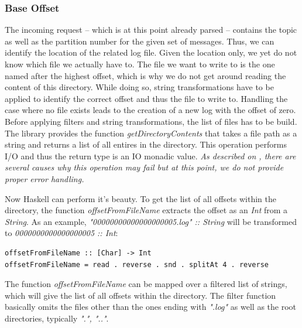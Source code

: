 \subsubsection{Base Offset}

The incoming request -- which is at this point already parsed -- contains the
topic as well as the partition number for the given set of messages. Thus, we
can identify the location of the related log file. Given the location only, we yet do
not know which file we actually have to.
The file we want to write to is the one named after the highest offset,
which is why we do not get around reading the content of this directory. While doing so,
string transformations have to be applied to identify the correct offset and thus the
file to write to. Handling the case where no file exists leads
to the creation of a new log with the offset of zero.
\\

Before applying filters and string transformations, the list of files has to be
build. The library
provides the function \textit{getDirectoryContents} that takes a file path as a
string and returns a list of all entires in the directory. This operation
performs I/O and thus the return type is an IO monadic value. \textit{As
described on
,
there are several causes why this operation may fail but at this point, we do
not provide proper error handling.}

Now Haskell can perform it's beauty. To get the list of all offsets within
the directory, the function \textit{offsetFromFileName} extracts the offset
as an \textit{Int} from a \textit{String}. As an example,
\textit{"00000000000000000005.log" :: String } will be transformed to
\textit{0000000000000000005 :: Int}:

\begin{lstlisting}
offsetFromFileName :: [Char] -> Int
offsetFromFileName = read . reverse . snd . splitAt 4 . reverse
\end{lstlisting}

The function \textit{offsetFromFileName} can be mapped over a filtered list of
strings, which will give the list of all offsets within the directory. The
filter function basically omits the files other than the ones ending with
\textit{".log"} as well as the root directories, typically \textit{".", ".."}.


